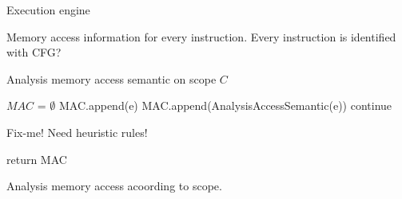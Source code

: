 Execution engine

Memory access information for every instruction.
Every instruction is identified with CFG?


\begin{algorithm}
  \caption{Analysis memory access semantic on scope $C$}
  \footnotesize
  \begin{algorithmic}[1]

    \State $MAC$ = $\emptyset$
    \State MAC.append(e)
    \State MAC.append(AnalysisAccessSemantic(e))
    \Else
    \State continue
    \EndIf
    \EndFor

    \State
    \State Fix-me! Need heuristic rules!

    \State
    \State return MAC
    \EndFunction
  \end{algorithmic}
\end{algorithm}






Analysis memory access acoording to scope.



